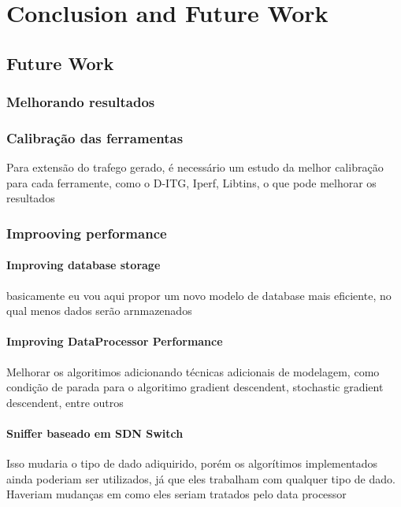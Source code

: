 \chapter{Conclusion and Future Work}

\section{Future Work}

\subsection{Melhorando resultados}

\subsection{Calibração das ferramentas}

Para extensão do trafego gerado, é necessário um estudo da melhor calibração para cada ferramente, como o D-ITG, Iperf, Libtins, o que pode melhorar os resultados


\subsection{Improoving performance}

\subsubsection{Improving database storage}

basicamente eu vou aqui propor um novo modelo de database mais eficiente, no qual menos dados serão arnmazenados

\subsubsection{Improving DataProcessor Performance}

Melhorar os algoritimos adicionando técnicas adicionais de modelagem, como condição de parada para o algoritimo gradient descendent, stochastic gradient descendent, entre outros


\subsubsection{Sniffer baseado em SDN Switch}
Isso mudaria o tipo de dado adiquirido, porém os algorítimos implementados ainda poderiam ser utilizados, já que eles trabalham com qualquer tipo de dado. Haveriam mudanças em como eles seriam tratados pelo data processor


